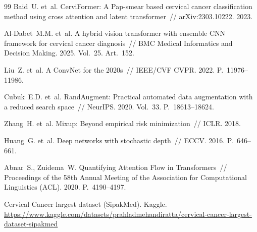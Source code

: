 \documentclass[14pt,a4paper]{extreport}
\begin{document}
\begin{thebibliography}{99}
Baid~U. et~al. CerviFormer: A Pap-smear based cervical cancer classification
method using cross attention and latent transformer~// arXiv:2303.10222. 2023.

Al-Dabet~M.M. et~al. A hybrid vision transformer with ensemble CNN framework
for cervical cancer diagnosis~// BMC Medical Informatics and Decision Making.
2025. Vol.~25. Art.~152.

Liu~Z. et~al. A ConvNet for the 2020s~// IEEE/CVF CVPR. 2022. P.~11976--11986.

Cubuk~E.D. et~al. RandAugment: Practical automated data augmentation with a
reduced search space~// NeurIPS. 2020. Vol.~33. P.~18613--18624.

Zhang~H. et~al. Mixup: Beyond empirical risk minimization~// ICLR. 2018.

Huang~G. et~al. Deep networks with stochastic depth~// ECCV. 2016.
P.~646--661.

Abnar~S., Zuidema~W. Quantifying Attention Flow in Transformers~//
Proceedings of the 58th Annual Meeting of the Association for
Computational Linguistics (ACL). 2020. P.~4190--4197.

Cervical Cancer largest dataset (SipakMed). Kaggle.
\url{https://www.kaggle.com/datasets/prahladmehandiratta/cervical-cancer-largest-dataset-sipakmed}

\end{thebibliography}
\end{document}
